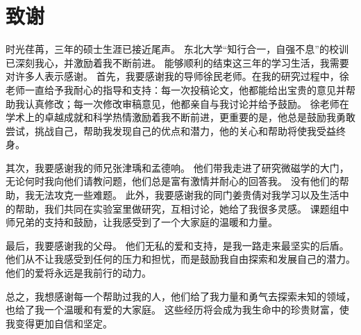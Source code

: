 \chapter*{致谢}
时光荏苒，三年的硕士生涯已接近尾声。
东北大学“知行合一，自强不息”的校训已深刻我心，并激励着我不断前进。
能够顺利的结束这三年的学习生活，我需要对许多人表示感谢。
首先，我要感谢我的导师徐民老师。在我的研究过程中，徐老师一直给予我耐心的指导和支持：每一次投稿论文，他都能给出宝贵的意见并帮助我认真修改；每一次修改审稿意见，他都亲自与我讨论并给予鼓励。
徐老师在学术上的卓越成就和科学热情激励着我不断前进，更重要的是，他总是鼓励我勇敢尝试，挑战自己，帮助我发现自己的优点和潜力，他的关心和帮助将使我受益终身。\par
其次，我要感谢我的师兄张津瑀和孟德响。
他们带我走进了研究微磁学的大门，无论何时我向他们请教问题，他们总是富有激情并耐心的回答我。
没有他们的帮助，我无法攻克一些难题。
此外，我要感谢我的同门姜贵倩对我学习以及生活中的帮助，我们共同在实验室里做研究，互相讨论，她给了我很多灵感。
课题组中师兄弟的支持和鼓励，让我感受到了一个大家庭的温暖和力量。\par
最后，我要感谢我的父母。
他们无私的爱和支持，是我一路走来最坚实的后盾。
他们从不让我感受到任何的压力和担忧，而是鼓励我自由探索和发展自己的潜力。
他们的爱将永远是我前行的动力。\par
总之，我想感谢每一个帮助过我的人，他们给了我力量和勇气去探索未知的领域，也给了我一个温暖和有爱的大家庭。
这些经历将会成为我生命中的珍贵财富，使我变得更加自信和坚定。
\newpage
\thispagestyle{empty} 
